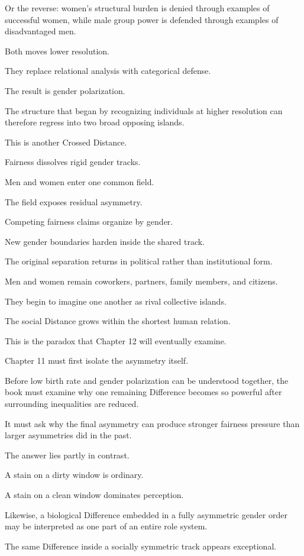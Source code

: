 Or the reverse: women’s structural burden is denied through examples of successful women, while male group power is defended through examples of disadvantaged men.

Both moves lower resolution.

They replace relational analysis with categorical defense.

The result is gender polarization.

The structure that began by recognizing individuals at higher resolution can therefore regress into two broad opposing islands.

This is another Crossed Distance.

Fairness dissolves rigid gender tracks.

Men and women enter one common field.

The field exposes residual asymmetry.

Competing fairness claims organize by gender.

New gender boundaries harden inside the shared track.

The original separation returns in political rather than institutional form.

Men and women remain coworkers, partners, family members, and citizens.

They begin to imagine one another as rival collective islands.

The social Distance grows within the shortest human relation.

This is the paradox that Chapter 12 will eventually examine.

Chapter 11 must first isolate the asymmetry itself.

Before low birth rate and gender polarization can be understood together, the book must examine why one remaining Difference becomes so powerful after surrounding inequalities are reduced.

It must ask why the final asymmetry can produce stronger fairness pressure than larger asymmetries did in the past.

The answer lies partly in contrast.

A stain on a dirty window is ordinary.

A stain on a clean window dominates perception.

Likewise, a biological Difference embedded in a fully asymmetric gender order may be interpreted as one part of an entire role system.

The same Difference inside a socially symmetric track appears exceptional.

